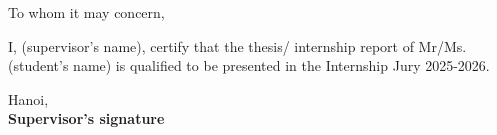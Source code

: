 \thispagestyle{empty}
\vspace*{3cm}

\begin{center}
    To whom it may concern,
\end{center}
\vspace{1cm}

I, \makebox[6.5cm]{\dotfill} (supervisor's name), certify that the
thesis/ internship report of Mr/Ms. \makebox[6cm]{\dotfill}(student's
name) is qualified to be presented in the Internship Jury 2025-2026.

\vspace{3cm}
\begin{flushright}
    Hanoi, \makebox[3.5cm]{\dotfill}\\[0.8cm]
    \textbf{Supervisor's signature}
\end{flushright}
\clearpage

